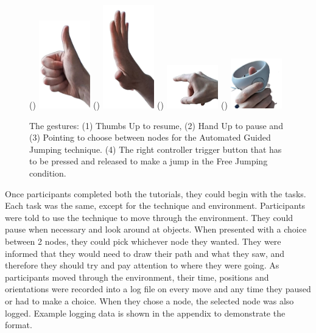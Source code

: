 \begin{figure}[]
	()
	\includegraphics[width=0.2\textwidth]{images/thumbs-up.pdf}
	()
	\includegraphics[width=0.2\textwidth]{images/hand-up.pdf}
	()
	\includegraphics[width=0.2\textwidth]{images/pointing.pdf}
	()
	\includegraphics[width=0.2\textwidth]{images/controller.pdf}
	\caption{The gestures: (1) Thumbs Up to resume, (2) Hand Up to pause and (3) Pointing to choose between nodes for the Automated Guided Jumping technique. (4) The right controller trigger button that has to be pressed and released to make a jump in the Free Jumping condition.}
	\label{fig:gestures-controller}
\end{figure}

Once participants completed both the tutorials, they could begin with the tasks. Each task was the same, except for the technique and environment. Participants were told to use the technique to move through the environment. They could pause when necessary and look around at objects. When presented with a choice between 2 nodes, they could pick whichever node they wanted. They were informed that they would need to draw their path and what they saw, and therefore they should try and pay attention to where they were going. As participants moved through the environment, their time, positions and orientations were recorded into a log file on every move and any time they paused or had to make a choice. When they chose a node, the selected node was also logged. Example logging data is shown in the appendix to demonstrate the format.

